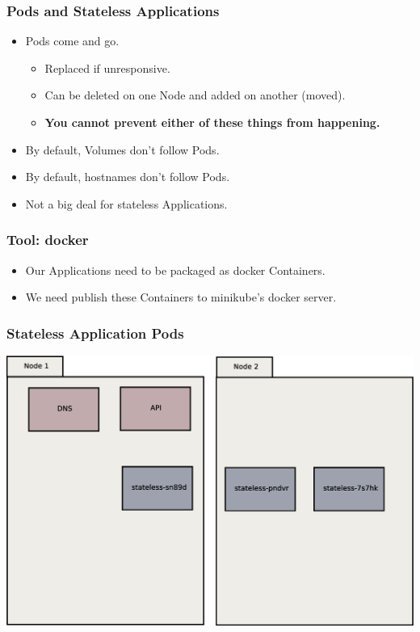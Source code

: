     \begin{frame}
        \frametitle{Pods and Stateless Applications}
        \begin{itemize}
            \item Pods come and go.\pause
            \begin{itemize}
                \item Replaced if unresponsive.\pause
                \item Can be deleted on one Node and added on another (moved).\pause
                \item \textbf{You cannot prevent either of these things from happening.}\pause
            \end{itemize}
            \item By default, Volumes don't follow Pods.\pause
            \item By default, hostnames don't follow Pods.\pause
            \item Not a big deal for stateless Applications.\pause
        \end{itemize}
    \end{frame}

    \begin{frame}
        \frametitle{Tool: docker\footnotemark}
        \begin{itemize}
            \item Our Applications need to be packaged as docker Containers.
            \item We need publish these Containers to minikube's docker server.
        \end{itemize}
    \end{frame}

    \begin{frame}
        \frametitle{Stateless Application Pods}
        \includegraphics[width=\textwidth,height=0.85\textheight,keepaspectratio]{graphics/02-statelessAppPods.eps}
    \end{frame}


